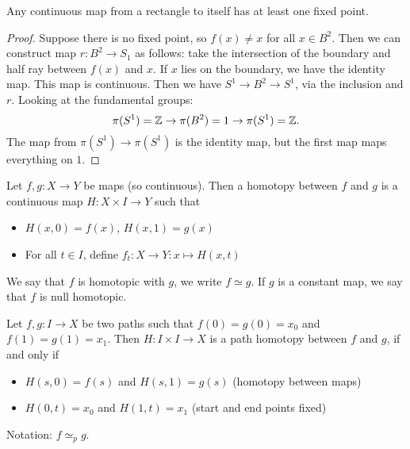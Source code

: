 \begin{theorem}
    Any continuous map from a rectangle to itself has at least one fixed point.
\end{theorem}
\begin{proof}
    Suppose there is no fixed point, so $f(x) \neq x$ for all  $x \in B^2$.
    Then we can construct map $r : B^2 \to  S_1$ as follows:
    take the intersection of the boundary and half ray between $f(x)$ and $x$.
    If $x$ lies on the boundary, we have the identity map.
    This map is continuous.
    Then we have $S^1 \to B^2 \to S^1$, via the inclusion and $r$.
    Looking at the fundamental groups:
    \[
        \pi(S^1)  =\mathbb{Z} \to  \pi(B^2) = 1 \to  \pi(S^1) = \mathbb{Z}
    .\] 
    The map from $\pi(S^1) \to  \pi(S^{1})$ is the identity map, but the first map maps everything on $1$. \phantom\qedhere\hfill\contra 
\end{proof}

\begin{definition}[Homotopy]
    Let $f,g:X\to Y$ be maps (so continuous). Then a homotopy between $f$ and $g$ is a continuous map $H: X\times I \to Y$ such that
    \begin{itemize}
        \item $H(x, 0) = f(x)$, $H(x, 1) = g(x)$ 
        \item For all $t \in I$, define $f_t: X \to  Y: x \mapsto  H(x, t)$
    \end{itemize}
    We say that $f$ is homotopic with $g$, we write $f \simeq g$.
    If $g$ is a constant map, we say that $f$ is null homotopic.
\end{definition}

\begin{definition}
    Let $f, g: I \to  X$ be two paths such that $f(0) = g(0) = x_0$ and $f(1) = g(1) = x_1$. Then $H: I \times  I \to  X$ is a path homotopy between $f$ and $g$, if and only if
    \begin{itemize}
        \item $H(s,0) = f(s)$ and  $H(s, 1) = g(s)$ (homotopy between maps)
        \item  $H(0, t) = x_0$ and $H(1, t) = x_1$ (start and end points fixed)
    \end{itemize}
    Notation: $f \simeq_p g$.
\end{definition}

